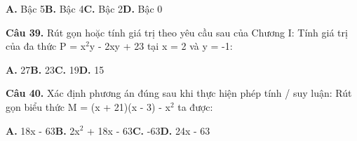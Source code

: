 \documentclass[11pt,a4paper]{article}
\begin{document}
\hspace*{1.5em}\textbf{A.} Bậc 5\quad\quad \textbf{B.} Bậc 4\quad\quad \textbf{C.} Bậc 2\quad\quad \textbf{D.} Bậc 0\par\vspace{2pt}
\textbf{\color{primary} Câu 39.} Rút gọn hoặc tính giá trị theo yêu cầu sau của Chương I: Tính giá trị của đa thức P = x$^2$y - 2xy + 23 tại x = 2 và y = -1:\par
\hspace*{1.5em}\textbf{A.} 27\quad\quad \textbf{B.} 23\quad\quad \textbf{C.} 19\quad\quad \textbf{D.} 15\par\vspace{2pt}
\textbf{\color{primary} Câu 40.} Xác định phương án đúng sau khi thực hiện phép tính / suy luận: Rút gọn biểu thức M = (x + 21)(x - 3) - x$^2$ ta được:\par
\hspace*{1.5em}\textbf{A.} 18x - 63\quad\quad \textbf{B.} 2x$^2$ + 18x - 63\quad\quad \textbf{C.} -63\quad\quad \textbf{D.} 24x - 63\par\vspace{2pt}
\end{document}
